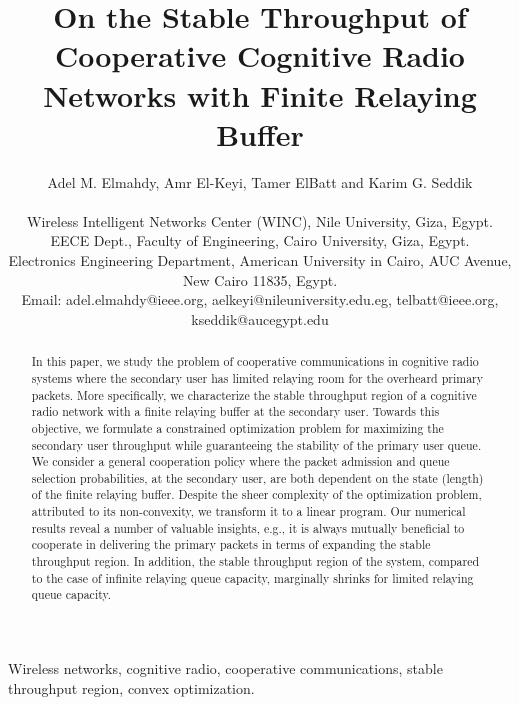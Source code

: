 \documentclass[conference]{IEEEtran}
\begin{document}
\title{On the Stable Throughput of Cooperative Cognitive Radio Networks with Finite Relaying Buffer}
\author{\large Adel M. Elmahdy, Amr El-Keyi, Tamer ElBatt and Karim G. Seddik\\ [.1in]
\normalsize
\begin{tabular}{c}
Wireless Intelligent Networks Center (WINC), Nile University, Giza, Egypt.\\
EECE Dept., Faculty of Engineering, Cairo University, Giza, Egypt.\\
Electronics Engineering Department, American University in Cairo, AUC Avenue, New Cairo 11835, Egypt.\\
Email: adel.elmahdy@ieee.org, aelkeyi@nileuniversity.edu.eg, telbatt@ieee.org, kseddik@aucegypt.edu
\end{tabular}
}
\maketitle

\begin{abstract}
In this paper, we study the problem of cooperative communications
in cognitive radio systems where the secondary user has limited
relaying room for the overheard primary packets. More
specifically, we characterize the stable throughput region of a
cognitive radio network with a finite relaying buffer at the
secondary user. Towards this objective, we formulate a constrained
optimization problem for maximizing the secondary user throughput 
while guaranteeing the stability of the primary user
queue. We consider a general cooperation policy where the packet
admission and queue selection probabilities, at the secondary
user, are both dependent on the state (length) of the finite
relaying buffer. Despite the sheer complexity of the optimization
problem, attributed to its non-convexity, we transform it to a 
linear program. Our numerical
results reveal a number of valuable insights, e.g., it is always
mutually beneficial to cooperate in delivering the primary packets
in terms of expanding the stable throughput region. In addition,
the stable throughput region of the system, compared to the case of 
infinite relaying queue capacity, marginally shrinks for limited relaying queue capacity.

\end{abstract}

\begin{IEEEkeywords}
Wireless networks, cognitive radio, cooperative communications, stable throughput region, convex optimization.
\end{IEEEkeywords}
\end{document}
